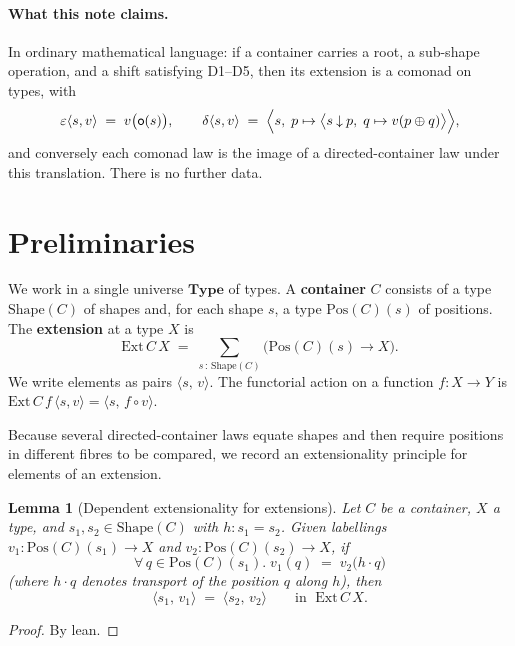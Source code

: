 \documentclass[11pt,a4paper]{article}
\theoremstyle{plain}
\newtheorem{lemma}[theorem]{Lemma}
\theoremstyle{definition}
\newcommand{\Ext}{\mathrm{Ext}}
\newcommand{\Shape}{\mathrm{Shape}}
\newcommand{\Pos}{\mathrm{Pos}}
\newcommand{\Type}{\mathbf{Type}}
\newcommand{\rootpos}{\mathsf{o}}
\newcommand{\sub}{\mathbin{\downarrow}}
\newcommand{\shift}{\oplus}
\begin{document}
\paragraph{What this note claims.}
In ordinary mathematical language: if a container carries a root, a sub-shape
operation, and a shift satisfying D1--D5, then its extension is a comonad on
types, with
\[
  \varepsilon\langle s,v\rangle \;=\; v\bigl(\rootpos(s)\bigr),
  \qquad
  \delta\langle s,v\rangle \;=\;
  \Bigl\langle s,\;
    p\mapsto\bigl\langle s\sub p,\;
      q\mapsto v(p\shift q)\bigr\rangle
  \Bigr\rangle,
\]
and conversely each comonad law is the image of a directed-container law under
this translation. There is no further data.

\section{Preliminaries}

We work in a single universe $\Type$ of types. A \textbf{container} $C$
consists of a type $\Shape(C)$ of shapes and, for each shape $s$, a type
$\Pos(C)(s)$ of positions. The \textbf{extension} at a type $X$ is
\begin{equation}
  \Ext\,C\,X \;=\; \sum_{s\,:\,\Shape(C)}\bigl(\Pos(C)(s)\to X\bigr).
\end{equation}
We write elements as pairs $\langle s,\,v\rangle$. The functorial action on a
function $f:X\to Y$ is
$\Ext\,C\,f\,\langle s,v\rangle = \langle s,\, f\circ v\rangle$.

Because several directed-container laws equate shapes and then require
positions in different fibres to be compared, we record an extensionality
principle for elements of an extension.

\begin{lemma}[Dependent extensionality for extensions]\label{lem:ext-eq}
Let $C$ be a container, $X$ a type, and $s_1,s_2\in\Shape(C)$ with
$h:s_1=s_2$. Given labellings $v_1:\Pos(C)(s_1)\to X$ and
$v_2:\Pos(C)(s_2)\to X$, if
\[
  \forall\, q\in\Pos(C)(s_1).\;
  v_1(q) \;=\; v_2\bigl(h\cdot q\bigr)
\]
(where $h\cdot q$ denotes transport of the position $q$ along $h$), then
\[
  \langle s_1,\,v_1\rangle \;=\; \langle s_2,\,v_2\rangle
  \qquad\text{in }\;\Ext\,C\,X.
\]
\end{lemma}

\begin{proof}
By lean.
\end{proof}
\end{document}
